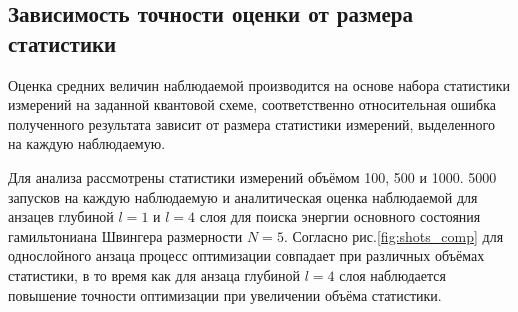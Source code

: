 \documentclass[14pt]{extarticle}
\begin{document}
\subsection[Зависимость точности оценки от размера статистики]{Зависимость точности оценки от размера \linebreak статистики}

\qquad Оценка средних величин наблюдаемой производится на основе набора статистики измерений на заданной квантовой схеме, соответственно относительная ошибка полученного результата зависит от размера статистики измерений, выделенного на каждую наблюдаемую.

\qquad Для анализа рассмотрены статистики измерений объёмом 100, 500 и 1000. 5000 запусков на каждую наблюдаемую и аналитическая оценка наблюдаемой для анзацев глубиной $l=1$ и $l=4$ слоя для поиска энергии основного состояния гамильтониана Швингера размерности $N = 5$. Согласно рис.\ref{fig:shots_comp} для однослойного анзаца процесс оптимизации совпадает при различных объёмах статистики, в то время как для анзаца глубиной $l=4$ слоя наблюдается повышение точности оптимизации при увеличении объёма статистики.
\end{document}
